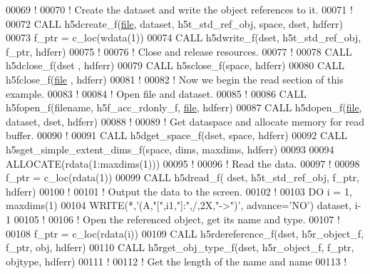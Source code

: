 \begin{DoxyCode}
00069   \textcolor{comment}{!}
00070   \textcolor{comment}{! Create the dataset and write the object references to it.}
00071   \textcolor{comment}{!}
00072   \textcolor{keyword}{CALL }h5dcreate\_f(\hyperlink{structfile}{file}, dataset, h5t\_std\_ref\_obj, space, dset, hdferr)
00073   f\_ptr = c\_loc(wdata(1))
00074   \textcolor{keyword}{CALL }h5dwrite\_f(dset, h5t\_std\_ref\_obj, f\_ptr, hdferr)
00075   \textcolor{comment}{!}
00076   \textcolor{comment}{! Close and release resources.}
00077   \textcolor{comment}{!}
00078   \textcolor{keyword}{CALL }h5dclose\_f(dset , hdferr)
00079   \textcolor{keyword}{CALL }h5sclose\_f(space, hdferr)
00080   \textcolor{keyword}{CALL }h5fclose\_f(\hyperlink{structfile}{file} , hdferr)
00081   \textcolor{comment}{!}
00082   \textcolor{comment}{! Now we begin the read section of this example.}
00083   \textcolor{comment}{!}
00084   \textcolor{comment}{! Open file and dataset.}
00085   \textcolor{comment}{!}
00086   \textcolor{keyword}{CALL }h5fopen\_f(filename, h5f\_acc\_rdonly\_f, \hyperlink{structfile}{file}, hdferr)
00087   \textcolor{keyword}{CALL }h5dopen\_f(\hyperlink{structfile}{file}, dataset, dset, hdferr)
00088   \textcolor{comment}{!}
00089   \textcolor{comment}{! Get dataspace and allocate memory for read buffer.}
00090   \textcolor{comment}{!}
00091   \textcolor{keyword}{CALL }h5dget\_space\_f(dset, space, hdferr)
00092   \textcolor{keyword}{CALL }h5sget\_simple\_extent\_dims\_f(space, dims, maxdims, hdferr)
00093 
00094   \textcolor{keyword}{ALLOCATE}(rdata(1:maxdims(1)))
00095   \textcolor{comment}{!}
00096   \textcolor{comment}{! Read the data.}
00097   \textcolor{comment}{!}
00098   f\_ptr = c\_loc(rdata(1))
00099   \textcolor{keyword}{CALL }h5dread\_f( dset, h5t\_std\_ref\_obj, f\_ptr, hdferr)
00100   \textcolor{comment}{!}
00101   \textcolor{comment}{! Output the data to the screen.}
00102   \textcolor{comment}{!}
00103   \textcolor{keywordflow}{DO} i = 1, maxdims(1)
00104      \textcolor{keyword}{WRITE}(*,\textcolor{stringliteral}{'(A,"[",i1,"]:",/,2X,"->")'}, advance=\textcolor{stringliteral}{'NO'}) dataset, i-1
00105      \textcolor{comment}{!}
00106      \textcolor{comment}{! Open the referenced object, get its name and type.}
00107      \textcolor{comment}{!}
00108      f\_ptr = c\_loc(rdata(i))
00109      \textcolor{keyword}{CALL }h5rdereference\_f(dset, h5r\_object\_f, f\_ptr, obj, hdferr)
00110      \textcolor{keyword}{CALL }h5rget\_obj\_type\_f(dset, h5r\_object\_f, f\_ptr, objtype, hdferr)
00111      \textcolor{comment}{!}
00112      \textcolor{comment}{! Get the length of the name and name}
00113      \textcolor{comment}{!}

\end{DoxyCode}
